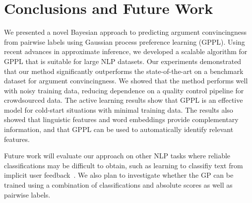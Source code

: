 \section{Conclusions and Future Work}

We presented a novel Bayesian approach to predicting argument convincingness from pairwise labels using
Gaussian process preference learning (GPPL).
Using recent advances in approximate inference, we developed a scalable algorithm for GPPL 
that is suitable for large NLP datasets.
Our experiments demonstrated that our method significantly outperforms the state-of-the-art
on a benchmark dataset for argument convincingness.
We showed that the method performs well with noisy training data, 
reducing dependence on a quality control pipeline for crowdsourced data. 
The active learning results show that GPPL is an effective model 
for cold-start situations with minimal training data.
The results also showed that linguistic features and word embeddings provide complementary information,
and that GPPL can be used to automatically identify relevant features.

Future work will evaluate our approach on other NLP tasks 
where reliable classifications may be difficult to obtain, 
such as learning to classifiy text from implicit user feedback~\cite{joachims2002optimizing}.
We also plan to investigate whether the GP can be trained 
using a combination of classifications and absolute scores as well as pairwise labels.
